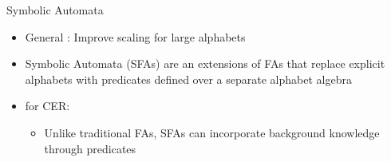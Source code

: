 \documentclass[10pt, aspectratio=169]{beamer}
\begin{document}

\begin{frame}{Symbolic Automata}
    \begin{itemize}
        \setlength{\itemsep}{12pt}
         \item General : Improve scaling for large alphabets
        \item Symbolic Automata (SFAs) are an extensions of FAs that replace explicit alphabets with predicates defined over a separate alphabet algebra
        \item {} for \textcolor{umBlueLighter}{CER}:
        \vspace{0.6em}
            \begin{itemize}
            \setlength{\itemsep}{4pt}
                \item Unlike traditional FAs, SFAs can incorporate background knowledge through predicates
            \end{itemize}
    \end{itemize}
\end{frame}
\end{document}
